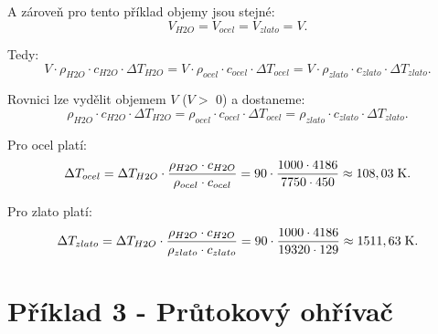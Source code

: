 \documentclass{article}
\begin{document}
A zároveň pro tento příklad objemy jsou stejné:
$$
    V_{H2O} = V_{ocel} = V_{zlato} = V.
$$

Tedy:
$$
    V \cdot \rho_{H2O} \cdot c_{H2O} \cdot \Delta T_{H2O} = V \cdot \rho_{ocel} \cdot c_{ocel} \cdot \Delta T_{ocel} = V \cdot \rho_{zlato} \cdot c_{zlato} \cdot \Delta T_{zlato}.
$$

Rovnici lze vydělit objemem $V$ ($V >$ 0) a dostaneme:
$$
    \rho_{H2O} \cdot c_{H2O} \cdot \Delta T_{H2O} = \rho_{ocel} \cdot c_{ocel} \cdot \Delta T_{ocel} = \rho_{zlato} \cdot c_{zlato} \cdot \Delta T_{zlato}.
$$

Pro ocel platí:
$$
    \Delta T_{ocel} = \Delta T_{H2O} \cdot \frac{\rho_{H2O} \cdot c_{H2O}}{\rho_{ocel} \cdot c_{ocel}} = 90 \cdot \frac{1 000 \cdot 4 186}{7 750 \cdot 450} \approx 108,03 \; \textrm{K}.
$$

Pro zlato platí:
$$
    \Delta T_{zlato} = \Delta T_{H2O} \cdot \frac{\rho_{H2O} \cdot c_{H2O}}{\rho_{zlato} \cdot c_{zlato}} = 90 \cdot \frac{1 000 \cdot 4 186}{19 320 \cdot 129} \approx 1511,63 \; \textrm{K}.
$$



\section*{Příklad 3 - Průtokový ohřívač}
\end{document}
